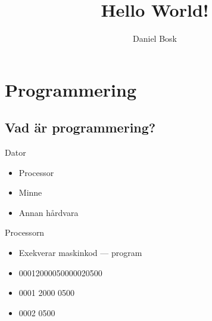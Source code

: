 \title{%
  Hello World!
}
\author{Daniel Bosk}


\mode*

\begin{abstract}
  
\end{abstract}


\section{Programmering}

\subsection{Vad är programmering?}

\begin{frame}
  \begin{block}{Dator}
    \begin{itemize}
      \item Processor
      \item Minne
      \item Annan hårdvara
    \end{itemize}
  \end{block}
\end{frame}

\begin{frame}
  \begin{block}{Processorn}
    \begin{itemize}
      \item Exekverar maskinkod --- program
    \end{itemize}
  \end{block}

  \pause

  \begin{example}
    \begin{itemize}
      \item<1-2> 00012000050000020500
      \item<3-> 0001 2000 0500
      \item<3-> 0002 0500
    \end{itemize}
  \end{example}
\end{frame}

